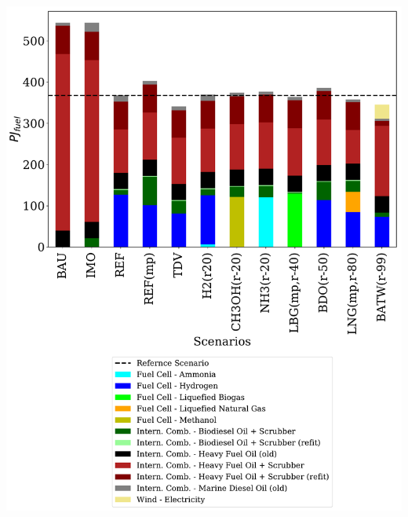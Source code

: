 \documentclass[article]{elsarticle}
\begin{document}
\noindent
\begin{minipage}[t]{0.49\textwidth}
    \centering
    \captionsetup{justification=centering}
    \includegraphics[width=.95\textwidth]{figures/AllFuelTotal.pdf}
    \label{fig:AllFuelTotal}
\end{minipage}
\end{document}
